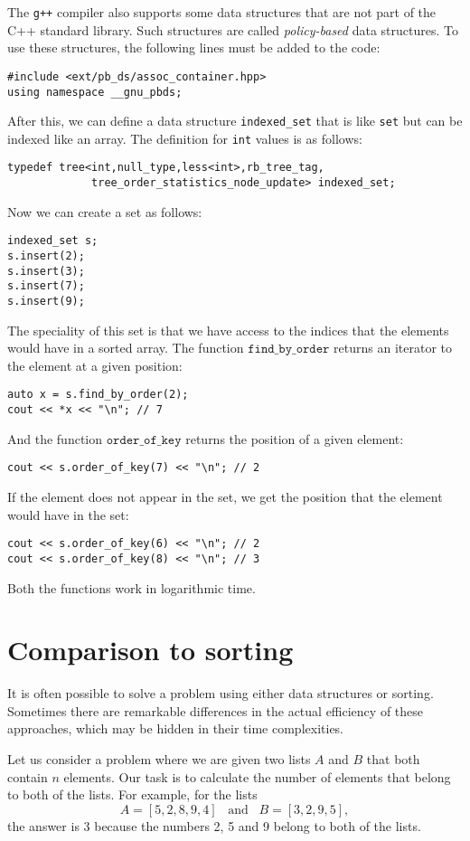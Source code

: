 The \texttt{g++} compiler also supports
some data structures that are not part
of the C++ standard library.
Such structures are called \emph{policy-based}
data structures.
To use these structures, the following lines
must be added to the code:
\begin{lstlisting}
#include <ext/pb_ds/assoc_container.hpp>
using namespace __gnu_pbds; 
\end{lstlisting}
After this, we can define a data structure \texttt{indexed\_set} that
is like \texttt{set} but can be indexed like an array.
The definition for \texttt{int} values is as follows:
\begin{lstlisting}
typedef tree<int,null_type,less<int>,rb_tree_tag,
             tree_order_statistics_node_update> indexed_set; 
\end{lstlisting}
Now we can create a set as follows:
\begin{lstlisting}
indexed_set s;
s.insert(2);
s.insert(3);
s.insert(7);
s.insert(9);
\end{lstlisting}
The speciality of this set is that we have access to
the indices that the elements would have in a sorted array.
The function $\texttt{find\_by\_order}$ returns
an iterator to the element at a given position:
\begin{lstlisting}
auto x = s.find_by_order(2);
cout << *x << "\n"; // 7
\end{lstlisting}
And the function $\texttt{order\_of\_key}$
returns the position of a given element:
\begin{lstlisting}
cout << s.order_of_key(7) << "\n"; // 2
\end{lstlisting}
If the element does not appear in the set,
we get the position that the element would have
in the set:
\begin{lstlisting}
cout << s.order_of_key(6) << "\n"; // 2
cout << s.order_of_key(8) << "\n"; // 3
\end{lstlisting}
Both the functions work in logarithmic time.

\section{Comparison to sorting}

It is often possible to solve a problem
using either data structures or sorting.
Sometimes there are remarkable differences
in the actual efficiency of these approaches,
which may be hidden in their time complexities.

Let us consider a problem where
we are given two lists $A$ and $B$
that both contain $n$ elements.
Our task is to calculate the number of elements
that belong to both of the lists.
For example, for the lists
\[A = [5,2,8,9,4] \hspace{10pt} \textrm{and} \hspace{10pt} B = [3,2,9,5],\]
the answer is 3 because the numbers 2, 5
and 9 belong to both of the lists.

